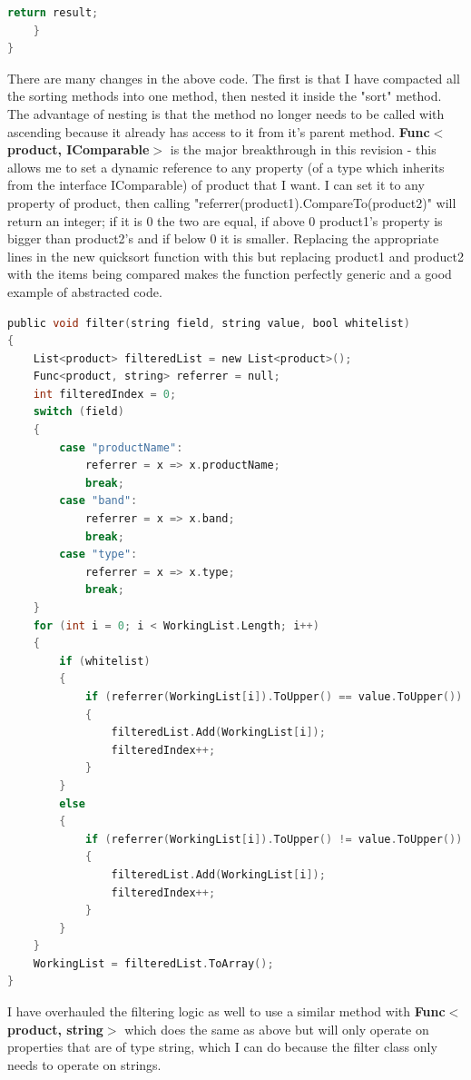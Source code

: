 ﻿\documentclass{article}
\begin{document}
\begin{enumerate}
\begin{lstlisting}[language=C]
        return result;
    }
}
        \end{lstlisting}
        There are many changes in the above code.
        The first is that I have compacted all the sorting methods into one method, then nested it inside the "sort" method.
        The advantage of nesting is that the method no longer needs to be called with ascending because it already has access to it from it's parent method.
        \textbf{Func$<$product, IComparable$>$} is the major breakthrough in this revision - this allows me to set a dynamic reference to any property (of a type which inherits from the interface IComparable) of product that I want.
        I can set it to any property of product, then calling "referrer(product1).CompareTo(product2)" will return an integer; if it is 0 the two are equal, if above 0 product1's property is bigger than product2's and if below 0 it is smaller.
        Replacing the appropriate lines in the new quicksort function with this but replacing product1 and product2 with the items being compared makes the function perfectly generic and a good example of abstracted code.
        \begin{lstlisting}[language=C]
public void filter(string field, string value, bool whitelist)
{
    List<product> filteredList = new List<product>();
    Func<product, string> referrer = null;
    int filteredIndex = 0;
    switch (field)
    {
        case "productName":
            referrer = x => x.productName;
            break;
        case "band":
            referrer = x => x.band;
            break;
        case "type":
            referrer = x => x.type;
            break;
    }
    for (int i = 0; i < WorkingList.Length; i++)
    {
        if (whitelist)
        {
            if (referrer(WorkingList[i]).ToUpper() == value.ToUpper())
            {
                filteredList.Add(WorkingList[i]);
                filteredIndex++;
            }
        }
        else
        {
            if (referrer(WorkingList[i]).ToUpper() != value.ToUpper())
            {
                filteredList.Add(WorkingList[i]);
                filteredIndex++;
            }
        }
    }
    WorkingList = filteredList.ToArray();
}
        \end{lstlisting}
        I have overhauled the filtering logic as well to use a similar method with \textbf{Func$<$product, string$>$} which does the same as above but will only operate on properties that are of type string, which I can do because the filter class only needs to operate on strings.
    \end{enumerate}
    \newpage
\end{document}
